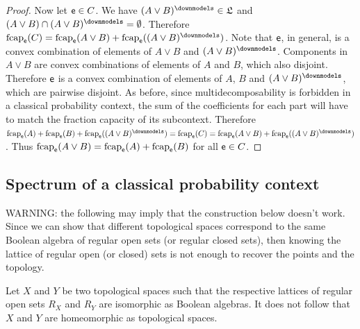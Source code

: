 \begin{mathSection}
\begin{proof}
		Now let $\mathsf{e} \in C$. We have $(A \vee B)^\separate \in \mathfrak{L}$ and $(A \vee B) \cap (A \vee B)^\separate = \emptyset$. Therefore $\fcap_{\ens}(C) = \fcap_{\ens}(A \vee B)+ \fcap_{\ens}((A \vee B)^\separate)$. Note that $\mathsf{e}$, in general, is a convex combination of elements of $A\vee B$ and $(A \vee B)^\separate$. Components in $A \vee B$ are convex combinations of elements of $A$ and $B$, which also disjoint. Therefore $\mathsf{e}$ is a convex combination of elements of $A$, $B$ and $(A \vee B)^\separate$, which are pairwise disjoint. As before, since multidecomposability is forbidden in a classical probability context, the sum of the coefficients for each part will have to match the fraction capacity of its subcontext. Therefore $\fcap_{\ens}(A) +  \fcap_{\ens}(B) + \fcap_{\ens}((A \vee B)^\separate) = \fcap_{\ens}(C) = \fcap_{\ens}(A \vee B) + \fcap_{\ens}((A \vee B)^\separate)$. Thus $\mathrm{fcap}_{\mathsf{e}}(A \vee B) = \mathrm{fcap}_{\mathsf{e}}(A) +  \mathrm{fcap}_{\mathsf{e}}(B)$ for all $\mathsf{e} \in C$.
	\end{proof}
\end{mathSection}

\subsection{Spectrum of a classical probability context}

WARNING: the following may imply that the construction below doesn't work. Since we can show that different topological spaces correspond to the same Boolean algebra of regular open sets (or regular closed sets), then knowing the lattice of regular open (or closed) sets is not enough to recover the points and the topology.

\begin{prop}\label{pm_es_regularOpenSetsNotEnough}
	Let $X$ and $Y$ be two topological spaces such that the respective lattices of regular open sets $R_X$ and $R_Y$ are isomorphic as Boolean algebras. It does not follow that $X$ and $Y$ are homeomorphic as topological spaces.
\end{prop}

